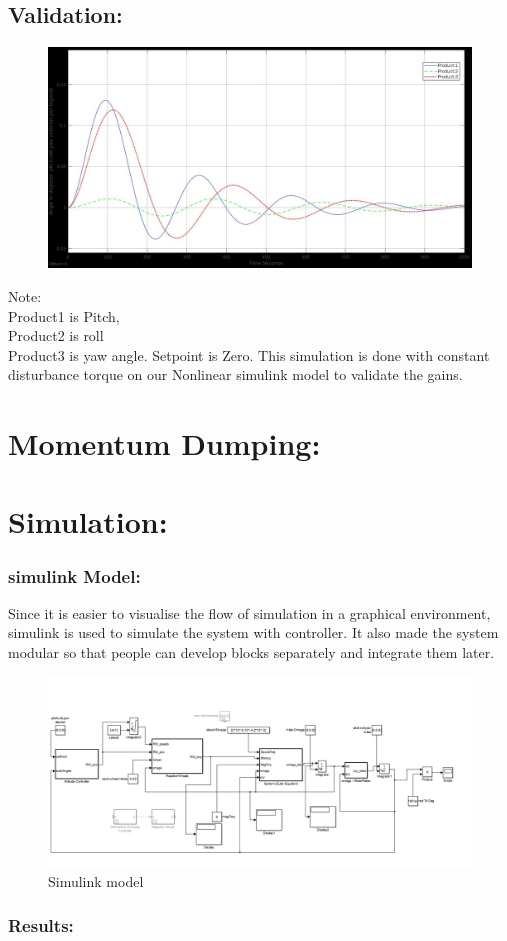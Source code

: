 \documentclass[10pt,a4paper]{report}
\begin{document}
\section{Validation:}
\begin{figure}[H]
	\centering
	\includegraphics[width=1.0\linewidth]{simulation_at_constantTOrq_pryangles}
	\caption{}
	\label{Constant disturbance torque. Pitch, Roll and yaw angles}
\end{figure}
Note: \\Product1 is Pitch, \\Product2 is roll \\ Product3 is yaw angle.
Setpoint is Zero. This simulation is done with constant disturbance torque on our Nonlinear simulink model to validate the gains.
\chapter{Momentum Dumping:}
\chapter{Simulation:}
\subsection{simulink Model:}
Since it is easier to visualise the flow of simulation in a graphical environment, simulink is used to simulate the system with controller.
It also made the system modular so that people can develop blocks separately and integrate them later.
\begin{figure}[H]
\centering
\includegraphics[scale=0.3]{Untitled1.png}
\caption{Simulink model}
\end{figure}
\subsection{Results:}
\end{document}
